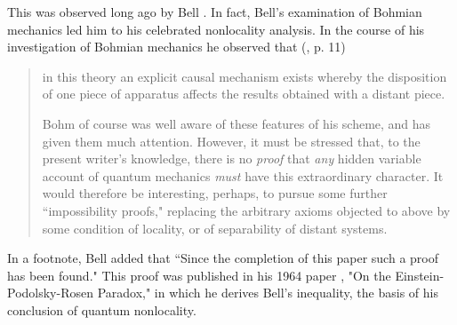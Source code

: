 \documentclass[12pt]{article}
\begin{document}
This was observed long ago by Bell \cite{Bel66}.  In fact, Bell's
examination of Bohmian mechanics led him to his celebrated nonlocality
analysis. In the course of his investigation of Bohmian mechanics he
observed that (\cite{Bel87}, p.  11)
\begin{quotation}\setlength{\baselineskip}{12pt}\noindent
   in this theory an explicit causal mechanism exists whereby the
   disposition of one piece of apparatus affects the results obtained
   with a distant piece.

   Bohm of course was well aware of these features of his scheme, and
   has given them much attention.  However, it must be stressed that,
   to the present writer's knowledge, there is no {\em proof} that {\em
     any} hidden variable account of quantum mechanics {\em must} have
   this extraordinary character. It would therefore be interesting,
   perhaps, to pursue some further ``impossibility proofs," replacing
   the arbitrary axioms objected to above by some condition of
   locality, or of separability of distant systems.
\end{quotation}
\noindent In a footnote, Bell added that ``Since the completion of
this paper such a proof has been found." This proof was published in
his 1964 paper \cite{Bel64}, "On the Einstein-Podolsky-Rosen Paradox,"
in which he derives Bell's inequality, the basis of his conclusion of
quantum nonlocality.
\end{document}
